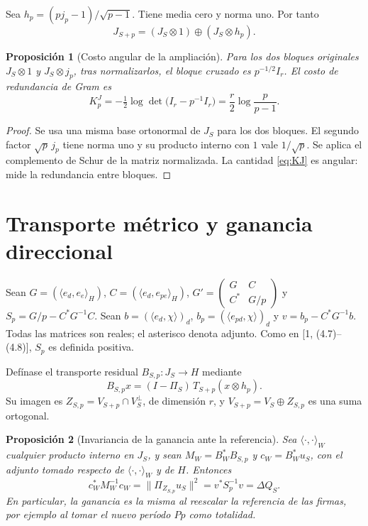 \documentclass[11pt,a4paper]{article}
\theoremstyle{plain}
\newtheorem{proposicion}{Proposición}
\begin{document}
Sea $h_p=(pj_p-1)/\sqrt{p-1}$. Tiene media cero y norma uno. Por tanto
\begin{equation}\label{eq:split}
J_{S+p}=(J_S\otimes 1)\oplus(J_S\otimes h_p).
\end{equation}

\begin{proposicion}[Costo angular de la ampliación]\label{prop:costo}
Para los dos bloques originales $J_S\otimes 1$ y $J_S\otimes j_p$, tras normalizarlos, el bloque cruzado es $p^{-1/2}I_r$. El costo de redundancia de Gram es
\begin{equation}\label{eq:KJ}
K^J_p=-\tfrac12\log\det\bigl(I_r-p^{-1}I_r\bigr)=\frac r2\log\frac{p}{p-1}.
\end{equation}
\end{proposicion}

\begin{proof}
Se usa una misma base ortonormal de $J_S$ para los dos bloques. El segundo factor $\sqrt p\,j_p$ tiene norma uno y su producto interno con $1$ vale $1/\sqrt p$. Se aplica el complemento de Schur de la matriz normalizada. La cantidad \eqref{eq:KJ} es angular: mide la redundancia entre bloques.
\end{proof}

\section{Transporte métrico y ganancia direccional}

Sean $G=(\langle e_d,e_e\rangle_H)$, $C=(\langle e_d,e_{pe}\rangle_H)$, $G'=\begin{pmatrix}G&C\\C^*&G/p\end{pmatrix}$ y $S_p=G/p-C^*G^{-1}C$. Sean $b=(\langle e_d,\chi\rangle)_d$, $b_p=(\langle e_{pd},\chi\rangle)_d$ y $v=b_p-C^*G^{-1}b$. Todas las matrices son reales; el asterisco denota adjunto. Como en [1, (4.7)–(4.8)], $S_p$ es definida positiva.

Defínase el transporte residual $B_{S,p}:J_S\to H$ mediante
\begin{equation}\label{eq:B}
B_{S,p}x=(I-\Pi_S)\,T_{S+p}(x\otimes h_p).
\end{equation}
Su imagen es $Z_{S,p}=V_{S+p}\cap V_S^{\perp}$, de dimensión $r$, y $V_{S+p}=V_S\oplus Z_{S,p}$ es una suma ortogonal.

\begin{proposicion}[Invariancia de la ganancia ante la referencia]\label{prop:inv}
Sea $\langle\cdot,\cdot\rangle_W$ cualquier producto interno en $J_S$, y sean $M_W=B^{*}_{W}B_{S,p}$ y $c_W=B^{*}_{W}u_S$, con el adjunto tomado respecto de $\langle\cdot,\cdot\rangle_W$ y de $H$. Entonces
\begin{equation}\label{eq:inv}
c_W^{*}M_W^{-1}c_W=\|\Pi_{Z_{S,p}}u_S\|^2=v^*S_p^{-1}v=\Delta Q_S .
\end{equation}
En particular, la ganancia es la misma al reescalar la referencia de las firmas, por ejemplo al tomar el nuevo período $Pp$ como totalidad.
\end{proposicion}
\end{document}
